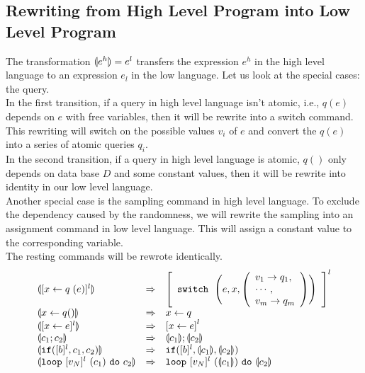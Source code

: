 \documentclass[a4paper,11pt]{article}
\begin{document}
\subsection{Rewriting from High Level Program into Low Level Program}
%
The transformation $\llparenthesis {e^h} \rrparenthesis = e^l$ transfers the expression $e^h$ in the high level language to an expression $e_l$ in the low language. 
Let us look at the special cases: the query.
\\
In the first transition, if a query in high level language isn't atomic, i.e., 
$q(e)$ depends on $e$ with free variables, then it will be rewrite into a switch command. 
This rewriting will switch on the possible values $v_i$ of $e$ and convert the $q(e)$ into a series of atomic queries $q_i$.
\\
In the second transition, if a query in high level language is atomic, $q()$ only depends on data base $D$ and some constant values,
then it will be rewrite into identity in our low level language.
\\
Another special case is the sampling command in high level language. To exclude the dependency caused by the randomness, we will rewrite the sampling into an assignment command in low level language. This will assign a constant value to the corresponding variable.
\\
The resting commands will be rewrote identically.
%
%
\[
\begin{array}{lll}
\ts{ [\assign x q(e)]^{l}}
        & \Rightarrow &
        \left[
        \begin{array}{l}
             \eswitch ~ \Bigg(\expr, x, 
            \left(\begin{array}{l}
           v_1 \to q_1, \\
            \cdots, \\
            v_m \to q_m
            \end{array}\right) 
            \Bigg) \\
        \end{array}
        \right]^{l}\\
    \ts{\assign{x}{q()}} & \Rightarrow & \assign{x}{q}\\
 \ts{[\assign{x}{\expr} ]^{l}}   &   \Rightarrow & \left[ \assign x \expr \right]^{l} \\
 \ts{ c_1 ; c_2 }     & \Rightarrow  & \ts{c_1} ; \ts{c_2} \\
  \ts{\eif([\bexpr]^{l}, c_1, c_2)}  &  \Rightarrow & \eif([\bexpr]^{l}, \ts{c_1}, \ts{c_2}) \\
 \ts{  \eloop ~ [\valr_N]^{l} ~ (c_1) ~ \edo ~ c_2  } & \Rightarrow & \eloop ~ [\valr_N]^{l} ~ (\ts{c_1}) ~ \edo ~ \ts{c_2}  \\
\end{array}
\]
\end{document}
